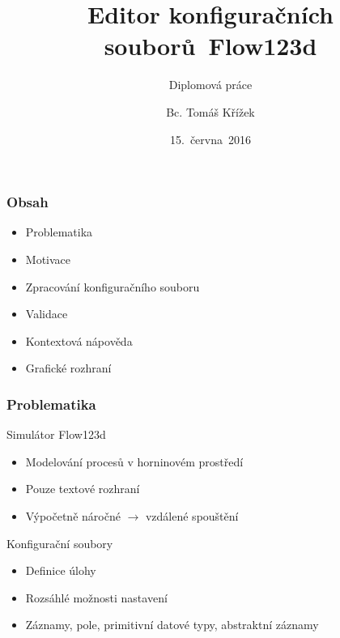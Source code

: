 




\usepackage{palatino}
\usepackage{graphicx}
\usepackage{transparent}


\title[Editor konfiguračních souborů~Flow123d]{Editor konfiguračních souborů~Flow123d}
\subtitle{Diplomová práce}
\author[Bc. Tomáš Křížek]{Bc. Tomáš Křížek}
\date{15.~června~2016}
\newcommand{\TextTitulniStranaPodLinkou}{\tiny
Studentská 2 {\color{FM_TUL} |} 461\,17 Liberec 2 {\color{FM_TUL} |} {tomas.krizek1@tul.cz} {\color{FM_TUL} |} 
\href{http://www.fm.tul.cz/}{www.fm.tul.cz}}

\renewcommand{\inserttotalframenumber}{\pageref{lastslide}}




\begin{frame}
	\titlepage
\end{frame}

\begin{frame}
	\frametitle{Obsah}
	\begin{itemize}
		\item Problematika
		\item Motivace
		\item Zpracování konfiguračního souboru
		\item Validace
		\item Kontextová nápověda
		\item Grafické rozhraní
	\end{itemize}
\end{frame}


\begin{frame}[t]
	\frametitle{Problematika}
	\begin{block}{Simulátor Flow123d}
	\begin{itemize}[<+->]
		\item Modelování procesů v horninovém prostředí
		\item Pouze textové rozhraní
		\item Výpočetně náročné $\rightarrow$ vzdálené spouštění
	\end{itemize}
	\end{block}
	
	\begin{block}{Konfigurační soubory}
	\begin{itemize}[<+->]
		\item Definice úlohy
		\item Rozsáhlé možnosti nastavení
		\item Záznamy, pole, primitivní datové typy, abstraktní záznamy
	\end{itemize}
	\end{block}
\end{frame}

